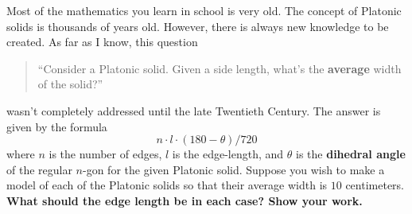 \documentclass[noauthor,nooutcomes,hints,handout]{ximera}
\begin{document}
\begin{question}
  Most of the mathematics you learn in school is very old. The concept
  of Platonic solids is thousands of years old. However, there is
  always new knowledge to be created. As far as I know, this question
  \begin{quote}
    ``Consider a Platonic solid. Given a side length, what's the
    \textbf{average} width of the solid?''
  \end{quote}
  wasn't completely addressed until the late Twentieth Century.
  The answer is given by the formula
  \[
  n \cdot l \cdot (180-\theta)/720
  \]
  where $n$ is the number of edges, $l$ is the edge-length, and
  $\theta$ is the \textbf{dihedral angle} of the regular $n$-gon for the given
  Platonic solid. Suppose you wish to make a model of each of the
  Platonic solids so that their average width is $10$
  centimeters. \textbf{What should the edge length be in each case?
    Show your work.}
\end{question}
\end{document}
